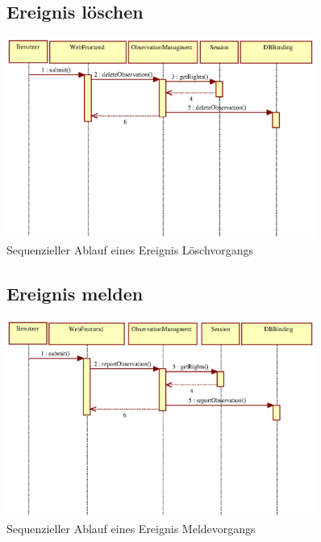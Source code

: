 \documentclass[a4paper,11pt]{scrartcl}
\begin{document}
\begin{figure}[h]
\subsection{Ereignis löschen}
		\centering
		\includegraphics[width=0.90\textwidth]{images/seq13_EreignisLoeschen.eps}
		\caption{Sequenzieller Ablauf eines Ereignis Löschvorgangs}
		\label{seq13}
\end{figure}




\begin{figure}[h]
\subsection{Ereignis melden}
		\centering
		\includegraphics[width=0.90\textwidth]{images/seq14_EreignisMelden.eps}
		\caption{Sequenzieller Ablauf eines Ereignis Meldevorgangs}
		\label{seq14}
\end{figure}
\end{document}
